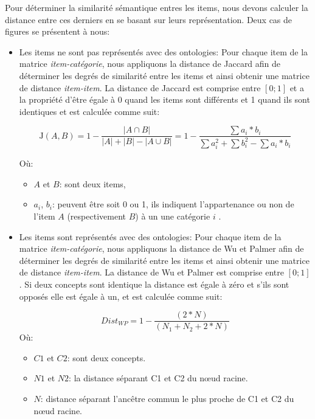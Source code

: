 Pour déterminer la similarité sémantique entres les items, nous devons calculer la distance entre ces derniers en se basant sur leurs représentation. Deux cas de figures se présentent à nous:
\begin{itemize}
	\item Les items ne sont pas représentés avec des ontologies: Pour chaque item de la matrice \textit{item-catégorie}, nous appliquons la distance de Jaccard  afin de déterminer les degrés de similarité entre les items et ainsi obtenir une matrice de distance \textit{item-item}. La distance de Jaccard est comprise entre $[0;1]$ et a la propriété d'être égale à 0 quand les items sont différents et 1 quand ils sont identiques et est calculée comme suit:
	
	\begin{equation}
	\displaystyle\text{J}(A,B) = 1 - \frac{|A\cap B|}{|A| + |B| -|A \cup B|} = 1 - \frac{\sum a_{i} * b_{i}}{\sum a_{i}^{2} + \sum b_{i}^{2} - \sum a_{i} * b_{i}}
	\end{equation}
	
	Où:
	\begin{itemize}
		\item $A$ et $B$: sont deux items,
		\item $a_{i}$, $b_{i}$: peuvent être soit 0 ou 1, ils indiquent l'appartenance ou non de l'item $A$ (respectivement $B$) à un une catégorie ${i}$ .
	\end{itemize}

\item Les items sont représentés avec des ontologies: Pour chaque item de la matrice \textit{item-catégorie}, nous appliquons la distance de Wu et Palmer  afin de déterminer les degrés de similarité entre les items et ainsi obtenir une matrice de distance \textit{item-item}. La distance de Wu et Palmer est comprise entre $[0;1]$. Si deux concepts sont identique la distance est égale à zéro et s'ils sont opposés elle est égale à un, et est calculée comme suit:

\begin{equation}
Dist_{WP}= 1 - \frac{ (2*N)}{(N_{1}+N_{2}+2*N)}
\end{equation}
Où:
\begin{itemize}
	\item $C1$ et $C2$: sont deux concepts.
	\item $N1$ et $N2$: la distance  séparant C1 et C2 du nœud racine.
	\item $N$: distance séparant l'ancêtre commun le plus proche de C1 et C2 du nœud racine.
\end{itemize}
\end{itemize}



